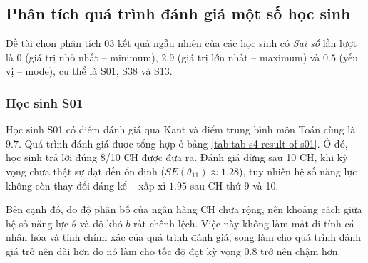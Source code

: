 \subsection{Phân tích quá trình đánh giá một số học sinh}

Đề tài chọn phân tích 03 kết quả ngẫu nhiên của các học sinh có \textit{Sai số} lần lượt là $0$ (giá trị nhỏ nhất – minimum), $2.9$ (giá trị lớn nhất – maximum) và $0.5$ (yếu vị – mode), cụ thể là S01, S38 và S13.\par

\subsubsection{Học sinh S01}
Học sinh S01 có điểm đánh giá qua Kant và điểm trung bình môn Toán cùng là $9.7$. Quá trình đánh giá được tổng hợp ở bảng \ref{tab:tab-s4-result-of-s01}. Ở đó, học sinh trả lời đúng 8/10 CH được đưa ra. Đánh giá dừng sau 10 CH, khi kỳ vọng chưa thật sự đạt đến ổn định ($SE(\theta_{11})\approx 1.28$), tuy nhiên hệ số năng lực không còn thay đổi đáng kể – xấp xỉ $1.95$ sau CH thứ 9 và 10.\par
Bên cạnh đó, do độ phân bố của ngân hàng CH chưa rộng, nên khoảng cách giữa hệ số năng lực $\theta$ và độ khó $b$ rất chênh lệch. Việc này không làm mất đi tính cá nhân hóa và tính chính xác của quá trình đánh giá, song làm cho quá trình đánh giá trở nên dài hơn do nó làm cho tốc độ đạt kỳ vọng $0.8$ trở nên chậm hơn.\par

